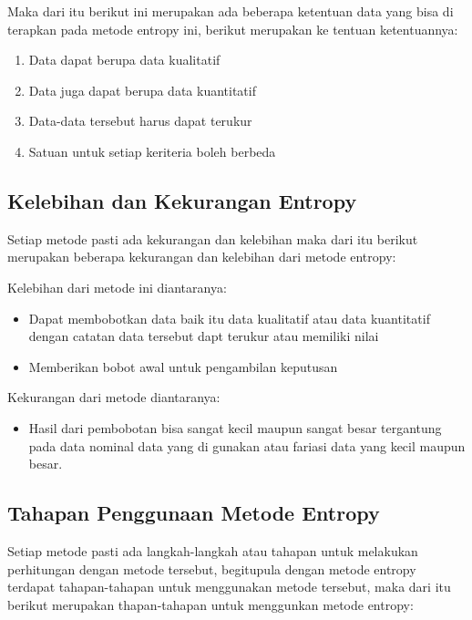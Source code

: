 Maka dari itu berikut ini merupakan ada beberapa ketentuan data yang bisa di terapkan pada metode entropy ini, berikut merupakan ke tentuan ketentuannya:
\begin{enumerate}

\item Data dapat berupa data kualitatif 
\item Data juga dapat berupa data kuantitatif
\item Data-data tersebut harus dapat terukur 
\item Satuan untuk setiap keriteria boleh berbeda
\end{enumerate}
\pagebreak

\subsection{Kelebihan dan Kekurangan Entropy}

Setiap metode pasti ada kekurangan dan kelebihan maka dari itu berikut merupakan beberapa kekurangan dan kelebihan dari metode entropy:

Kelebihan dari metode ini diantaranya:\par
\begin{itemize}
\item Dapat membobotkan data baik itu data kualitatif atau data kuantitatif dengan catatan data tersebut dapt terukur atau memiliki nilai

\item Memberikan bobot awal untuk pengambilan keputusan
\end{itemize}
Kekurangan dari metode diantaranya:\par
\begin{itemize}
\item Hasil dari pembobotan bisa sangat kecil maupun sangat besar tergantung pada data nominal data yang di gunakan atau fariasi data yang kecil maupun besar.
\end{itemize}
\subsection{Tahapan Penggunaan Metode Entropy}
	Setiap metode pasti ada langkah-langkah atau tahapan untuk melakukan perhitungan dengan metode tersebut, begitupula dengan metode entropy terdapat tahapan-tahapan untuk menggunakan metode tersebut, maka dari itu berikut merupakan thapan-tahapan untuk menggunkan metode entropy:

